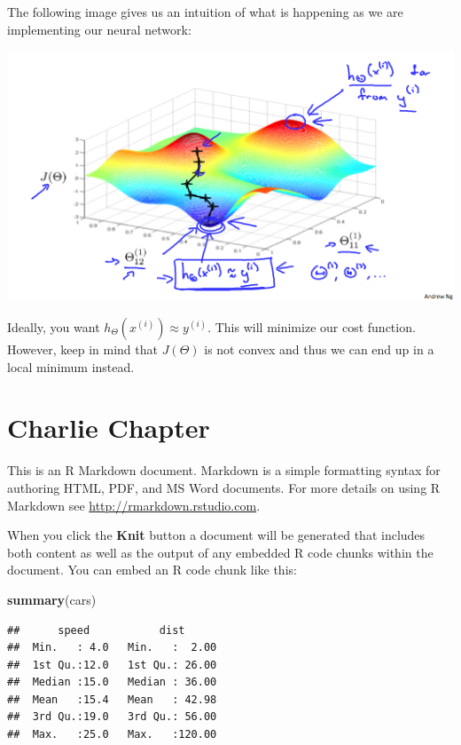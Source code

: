 \documentclass[
]{book}
\newenvironment{Shaded}{\begin{snugshade}}{\end{snugshade}}
\newcommand{\KeywordTok}[1]{\textcolor[rgb]{0.13,0.29,0.53}{\textbf{#1}}}
\newcommand{\NormalTok}[1]{#1}
\begin{document}
The following image gives us an intuition of what is happening as we are implementing our neural network:

\includegraphics{puttingItTogether.png}

Ideally, you want \(h_\Theta(x^{(i)})\approx y^{(i)}\). This will minimize our cost function. However, keep in mind that \(J(\Theta)\) is not convex and thus we can end up in a local minimum instead.

\hypertarget{charlie-chapter}{%
\chapter{Charlie Chapter}\label{charlie-chapter}}

This is an R Markdown document. Markdown is a simple formatting syntax for authoring HTML, PDF, and MS Word documents. For more details on using R Markdown see \url{http://rmarkdown.rstudio.com}.

When you click the \textbf{Knit} button a document will be generated that includes both content as well as the output of any embedded R code chunks within the document. You can embed an R code chunk like this:

\begin{Shaded}
\begin{Highlighting}[]
\KeywordTok{summary}\NormalTok{(cars)}
\end{Highlighting}
\end{Shaded}

\begin{verbatim}
##      speed           dist       
##  Min.   : 4.0   Min.   :  2.00  
##  1st Qu.:12.0   1st Qu.: 26.00  
##  Median :15.0   Median : 36.00  
##  Mean   :15.4   Mean   : 42.98  
##  3rd Qu.:19.0   3rd Qu.: 56.00  
##  Max.   :25.0   Max.   :120.00
\end{verbatim}
\end{document}
